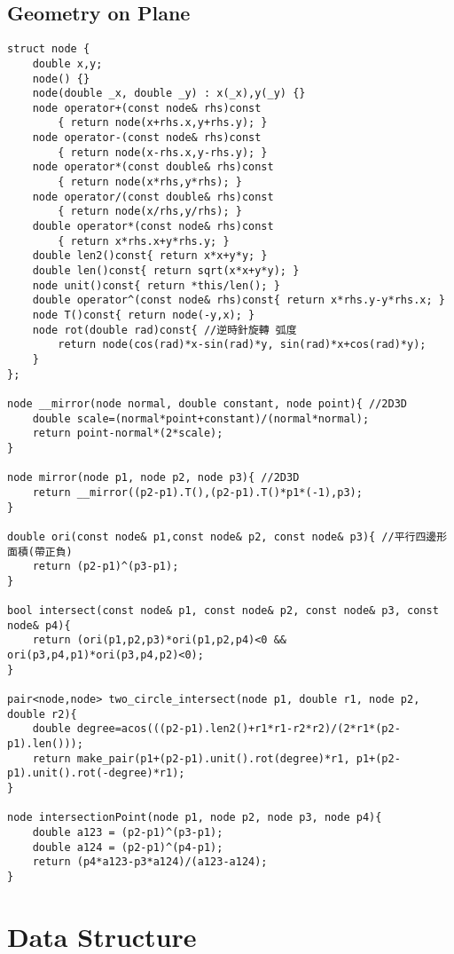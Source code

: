 \documentclass[11pt,twocolumn,a4paper]{article}
\begin{document}
\subsection{Geometry on Plane}
\begin{lstlisting}[label=Geometry on Plane]
struct node {
	double x,y;
	node() {}
	node(double _x, double _y) : x(_x),y(_y) {}
	node operator+(const node& rhs)const
		{ return node(x+rhs.x,y+rhs.y); }
	node operator-(const node& rhs)const
		{ return node(x-rhs.x,y-rhs.y); }
	node operator*(const double& rhs)const
		{ return node(x*rhs,y*rhs); }
	node operator/(const double& rhs)const
		{ return node(x/rhs,y/rhs); }
	double operator*(const node& rhs)const
		{ return x*rhs.x+y*rhs.y; }
	double len2()const{ return x*x+y*y; }
	double len()const{ return sqrt(x*x+y*y); }
	node unit()const{ return *this/len(); }
	double operator^(const node& rhs)const{ return x*rhs.y-y*rhs.x; }
	node T()const{ return node(-y,x); }
	node rot(double rad)const{ //逆時針旋轉 弧度
		return node(cos(rad)*x-sin(rad)*y, sin(rad)*x+cos(rad)*y);
	}
};

node __mirror(node normal, double constant, node point){ //2D3D
	double scale=(normal*point+constant)/(normal*normal);
	return point-normal*(2*scale);
}

node mirror(node p1, node p2, node p3){ //2D3D
	return __mirror((p2-p1).T(),(p2-p1).T()*p1*(-1),p3);
}

double ori(const node& p1,const node& p2, const node& p3){ //平行四邊形面積(帶正負)
	return (p2-p1)^(p3-p1);
}

bool intersect(const node& p1, const node& p2, const node& p3, const node& p4){
	return (ori(p1,p2,p3)*ori(p1,p2,p4)<0 && ori(p3,p4,p1)*ori(p3,p4,p2)<0);
}

pair<node,node> two_circle_intersect(node p1, double r1, node p2, double r2){
	double degree=acos(((p2-p1).len2()+r1*r1-r2*r2)/(2*r1*(p2-p1).len()));
	return make_pair(p1+(p2-p1).unit().rot(degree)*r1, p1+(p2-p1).unit().rot(-degree)*r1);
}

node intersectionPoint(node p1, node p2, node p3, node p4){
	double a123 = (p2-p1)^(p3-p1);
	double a124 = (p2-p1)^(p4-p1);
	return (p4*a123-p3*a124)/(a123-a124);
}
\end{lstlisting}


\newpage
\section{Data Structure}
\end{document}
